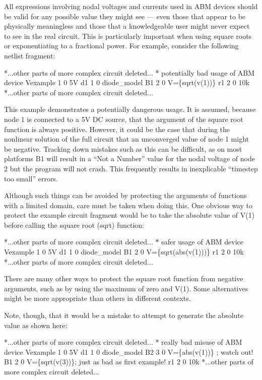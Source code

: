 All expressions involving nodal voltages and currents used in ABM
devices should be valid for any possible value they might see --- even
those that appear to be physically meaningless and those that a
knowledgeable user might never expect to see in the real circuit. This
is particularly important when using square roots or exponentiating to
a fractional power. For example, consider the following netlist
fragment:


\begin{vquote}
*...other parts of more complex circuit deleted...
\color{blue}* potentially bad usage of ABM device \color{black}
Vexample 1 0 5V
d1 1 0 diode_model
\color{red}B1 2 0 V=\{sqrt(v(1))\}\color{black}
r1 2 0 10k
*...other parts of more complex circuit deleted...
\end{vquote}

This example demonstrates a potentially dangerous usage. It is
assumed, because node 1 is connected to a 5V DC source, that the argument
of the square root function is always positive. However, it could be
the case that during the nonlinear solution of the full circuit that an
unconverged value of node 1 might be negative. Tracking down mistakes
such as this can be difficult, as on most
platforms B1 will result in a ``Not a Number'' value for the nodal voltage
of node 2 but the program will not crash. This frequently results in
inexplicable ``timestep too small'' errors.

Although such things can be avoided by protecting the arguments of
functions with a limited domain, care must be taken when doing this. One
obvious way to protect the example circuit fragment would be to take
the absolute value of V(1) before calling the square root (sqrt)
function:

\begin{vquote}
*...other parts of more complex circuit deleted...
\color{blue}* safer usage of ABM device \color{black}
Vexample 1 0 5V
d1 1 0 diode_model
B1 2 0 V=\{sqrt(abs(v(1)))\}
r1 2 0 10k
*...other parts of more complex circuit deleted...
\end{vquote}

There are many other ways to protect the square root function from
negative arguments, such as by using the maximum of zero and V(1).
Some alternatives might be more appropriate than others in different
contexts.

Note, though, that it would be a mistake to attempt to generate the absolute 
value as shown here: 
\begin{vquote}
*...other parts of more complex circuit deleted...
\color{blue}* really bad misuse of ABM device \color{black}
Vexample 1 0 5V
d1 1 0 diode_model
\color{red}B2 3 0 V=\{abs(v(1))\} ; watch out!
B1 2 0 V=\{sqrt(v(3))\}; just as bad as first example!\color{black}
r1 2 0 10k
*...other parts of more complex circuit deleted...
\end{vquote}

